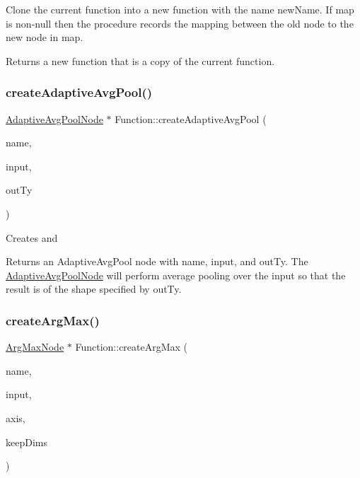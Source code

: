 Clone the current function into a new function with the name {\ttfamily new\+Name}. If {\ttfamily map} is non-\/null then the procedure records the mapping between the old node to the new node in {\ttfamily map}. \begin{DoxyReturn}{Returns}
a new function that is a copy of the current function. 
\end{DoxyReturn}
\mbox{\label{classglow_1_1_function_a5145a97eddf1d1dd26ae7a9de37b341b}} 
\subsubsection{\texorpdfstring{create\+Adaptive\+Avg\+Pool()}{createAdaptiveAvgPool()}}
{\footnotesize\ttfamily \hyperlink{classglow_1_1_adaptive_avg_pool_node}{Adaptive\+Avg\+Pool\+Node} $\ast$ Function\+::create\+Adaptive\+Avg\+Pool (\begin{DoxyParamCaption}\item[{llvm\+::\+String\+Ref}]{name,  }\item[{\hyperlink{structglow_1_1_node_value}{Node\+Value}}]{input,  }\item[{\hyperlink{structglow_1_1_type}{Type\+Ref}}]{out\+Ty }\end{DoxyParamCaption})}

Creates and \begin{DoxyReturn}{Returns}
an Adaptive\+Avg\+Pool node with {\ttfamily name}, {\ttfamily input}, and {\ttfamily out\+Ty}. The \hyperlink{classglow_1_1_adaptive_avg_pool_node}{Adaptive\+Avg\+Pool\+Node} will perform average pooling over the input so that the result is of the shape specified by {\ttfamily out\+Ty}. 
\end{DoxyReturn}
\mbox{\label{classglow_1_1_function_a0dffc1674d4a1654cb7206a4d7752b1e}} 
\subsubsection{\texorpdfstring{create\+Arg\+Max()}{createArgMax()}}
{\footnotesize\ttfamily \hyperlink{classglow_1_1_arg_max_node}{Arg\+Max\+Node} $\ast$ Function\+::create\+Arg\+Max (\begin{DoxyParamCaption}\item[{llvm\+::\+String\+Ref}]{name,  }\item[{\hyperlink{structglow_1_1_node_value}{Node\+Value}}]{input,  }\item[{\hyperlink{namespaceglow_a0ca574644e1e42ef193a9947fb4d8911}{unsigned\+\_\+t}}]{axis,  }\item[{bool}]{keep\+Dims }\end{DoxyParamCaption})}

